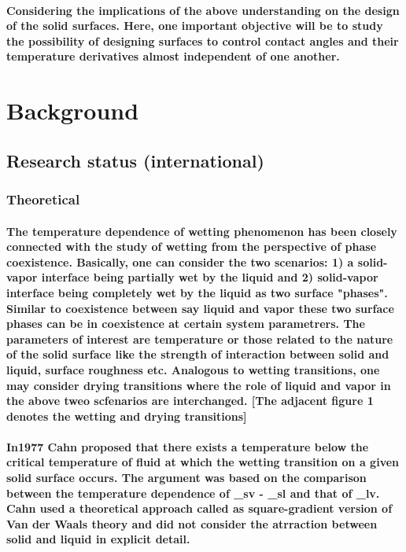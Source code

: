 \documentclass[a4paper,12pt,single,pdftex]{scrartcl}
\begin{document}
\label{ID_703377776}\paragraph{Considering the implications of the above understanding on the design of the solid surfaces. Here, one important objective will be to study the possibility of designing surfaces to control contact angles and their temperature derivatives almost independent of one another.}

\label{ID_1110611260}\section{Background}

\label{ID_1392626561}\subsection{Research status (international)}

\label{ID_688891944}\subsubsection{Theoretical}

\label{ID_1917907773}\paragraph{The temperature dependence of wetting phenomenon has been closely connected with the study of wetting  from the perspective of phase coexistence. Basically, one can consider the two scenarios: 1) a solid-vapor interface being partially wet by the liquid and 2) solid-vapor interface being completely wet by the liquid as two surface "phases". Similar to coexistence between say liquid and vapor these two surface phases can be in coexistence at certain system parametrers. The parameters of interest are temperature or those related to the nature of the solid surface like the strength of interaction between solid and liquid, surface roughness etc. Analogous to wetting transitions, one may consider drying transitions where the role of liquid and vapor in the above tweo scfenarios are interchanged. [The adjacent figure 1 denotes the wetting and drying transitions]}

\label{ID_1762818689}\paragraph{In1977 Cahn proposed that there exists a temperature below the critical temperature of fluid at which the wetting transition on a given solid surface occurs. The argument was based on the comparison between the temperature dependence of \gamma_{sv} - \gamma_{sl}  and that of \gamma_{lv}. Cahn used a theoretical approach called as square-gradient version of Van der Waals theory and did not consider the atrraction between solid and liquid in explicit detail.}
\end{document}
